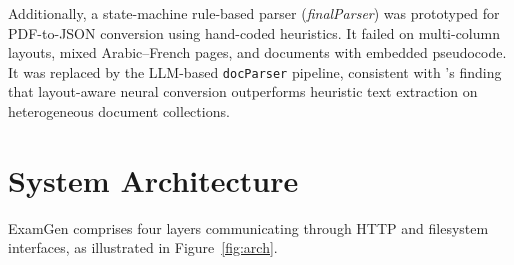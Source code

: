 \documentclass[12pt, a4paper]{article}
\begin{document}
Additionally, a state-machine rule-based parser (\textit{finalParser}) was
prototyped for PDF-to-JSON conversion using hand-coded heuristics. It failed on
multi-column layouts, mixed Arabic--French pages, and documents with embedded
pseudocode. It was replaced by the LLM-based \texttt{docParser} pipeline,
consistent with \citet{docling2024}'s finding that layout-aware neural conversion
outperforms heuristic text extraction on heterogeneous document collections.

\section{System Architecture}
\label{sec:arch}

ExamGen comprises four layers communicating through HTTP and filesystem interfaces,
as illustrated in Figure~\ref{fig:arch}.
\end{document}
